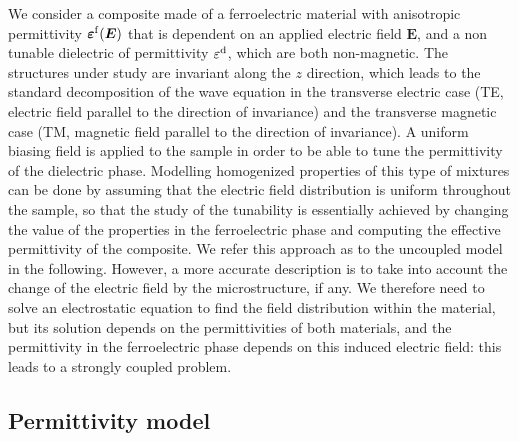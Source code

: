 \documentclass[openacc]{rsproca_new}%
\newcommand{\B}{\boldsymbol}
\newcommand{\tens}[1]{\B{#1}}
\newcommand{\epsftens}{\tens{\varepsilon}^{\rm f}}
\newcommand{\epsd}{\varepsilon^{\rm d}}
\begin{document}
We consider a composite made of a ferroelectric material with anisotropic
permittivity $\epsftens(\B E)$
that is dependent on an applied electric field $\B E$,
and a non tunable dielectric of permittivity $\epsd$, which are both non-magnetic.
The structures under study are invariant along the $z$ direction, which leads to the standard decomposition
of the wave equation in the transverse electric case (TE, electric field parallel
to the direction of invariance) and the
transverse magnetic case (TM, magnetic field parallel to the direction
of invariance).
A uniform biasing field is applied to the sample in order to be able to tune the
permittivity of the dielectric phase.
Modelling homogenized properties of this type of mixtures can be done by assuming
that the electric field distribution is uniform throughout the sample,
so that the study of the tunability is
essentially achieved by changing the value of the properties in the ferroelectric phase and computing
the effective permittivity
of the composite. We refer this approach as to the uncoupled model in the following.
However, a more accurate description is to take into account the change of the
electric field by the microstructure, if any. We therefore need to solve an
electrostatic equation to find the field distribution within the material, but its solution
depends on the permittivities of both materials, and the permittivity in the
ferroelectric phase depends on this induced electric field: this leads to a strongly coupled problem.\\

\subsection{Permittivity model\label{permmodel}}
\end{document}
